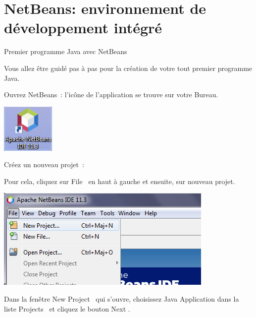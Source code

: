 \documentclass[a4paper,11pt]{style-esi/td}
\begin{document}

\section{NetBeans: environnement de développement intégré }

\begin{Tutoriel}{Premier programme Java avec NetBeans}

	Vous allez être guidé pas à pas pour la création de votre tout premier programme Java.

	\begin{steps}
		\item Ouvrez NetBeans~:
		l'icône de l'application se trouve sur votre Bureau.

		\bigskip
		\begin{center}
			\includegraphics[scale=0.6]{images/anb113_icone}
		\end{center}


		\item Créez un nouveau projet~:

		Pour cela, cliquez sur \og File \fg~en haut à gauche et ensuite, sur nouveau projet.

		\bigskip
		\begin{center}
			\includegraphics[scale=0.75]{images/anb113_newproject}
		\end{center}

		Dans la fenêtre \og New Project \fg~qui s'ouvre, choisissez \og Java Application \fg dans la liste \og Projects \fg~et cliquez le bouton \og Next \fg.


\end{steps}
\end{Tutoriel}
\end{document}
